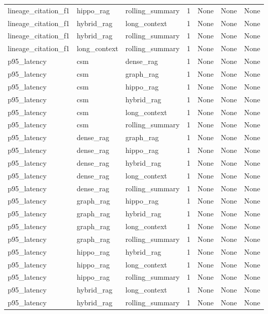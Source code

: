 \begin{tabular}{lllllll}
lineage\_citation\_f1 & hippo\_rag & rolling\_summary & 1 & None & None & None \\
lineage\_citation\_f1 & hybrid\_rag & long\_context & 1 & None & None & None \\
lineage\_citation\_f1 & hybrid\_rag & rolling\_summary & 1 & None & None & None \\
lineage\_citation\_f1 & long\_context & rolling\_summary & 1 & None & None & None \\
p95\_latency & csm & dense\_rag & 1 & None & None & None \\
p95\_latency & csm & graph\_rag & 1 & None & None & None \\
p95\_latency & csm & hippo\_rag & 1 & None & None & None \\
p95\_latency & csm & hybrid\_rag & 1 & None & None & None \\
p95\_latency & csm & long\_context & 1 & None & None & None \\
p95\_latency & csm & rolling\_summary & 1 & None & None & None \\
p95\_latency & dense\_rag & graph\_rag & 1 & None & None & None \\
p95\_latency & dense\_rag & hippo\_rag & 1 & None & None & None \\
p95\_latency & dense\_rag & hybrid\_rag & 1 & None & None & None \\
p95\_latency & dense\_rag & long\_context & 1 & None & None & None \\
p95\_latency & dense\_rag & rolling\_summary & 1 & None & None & None \\
p95\_latency & graph\_rag & hippo\_rag & 1 & None & None & None \\
p95\_latency & graph\_rag & hybrid\_rag & 1 & None & None & None \\
p95\_latency & graph\_rag & long\_context & 1 & None & None & None \\
p95\_latency & graph\_rag & rolling\_summary & 1 & None & None & None \\
p95\_latency & hippo\_rag & hybrid\_rag & 1 & None & None & None \\
p95\_latency & hippo\_rag & long\_context & 1 & None & None & None \\
p95\_latency & hippo\_rag & rolling\_summary & 1 & None & None & None \\
p95\_latency & hybrid\_rag & long\_context & 1 & None & None & None \\
p95\_latency & hybrid\_rag & rolling\_summary & 1 & None & None & None \\

\end{tabular}
